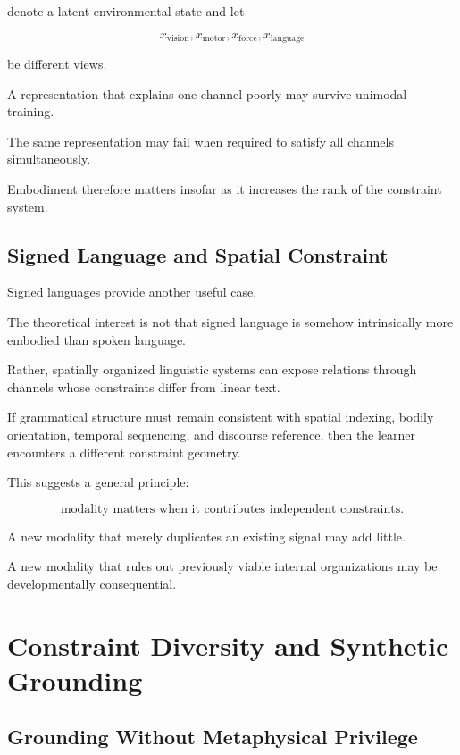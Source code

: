 \documentclass[11pt]{article}
\theoremstyle{remark}
\begin{document}
denote a latent environmental state and let

\begin{equation}
x_{\mathrm{vision}},
x_{\mathrm{motor}},
x_{\mathrm{force}},
x_{\mathrm{language}}
\end{equation}

be different views.

A representation that explains one channel poorly may survive unimodal training.

The same representation may fail when required to satisfy all channels simultaneously.

Embodiment therefore matters insofar as it increases the rank of the constraint system.

\subsection{Signed Language and Spatial Constraint}

Signed languages provide another useful case.

The theoretical interest is not that signed language is somehow intrinsically more embodied than spoken language.

Rather, spatially organized linguistic systems can expose relations through channels whose constraints differ from linear text.

If grammatical structure must remain consistent with spatial indexing, bodily orientation, temporal sequencing, and discourse reference, then the learner encounters a different constraint geometry.

This suggests a general principle:

\begin{equation}
\boxed{
\text{modality matters when it contributes independent constraints}.
}
\end{equation}

A new modality that merely duplicates an existing signal may add little.

A new modality that rules out previously viable internal organizations may be developmentally consequential.

\section{Constraint Diversity and Synthetic Grounding}

\subsection{Grounding Without Metaphysical Privilege}
\end{document}
